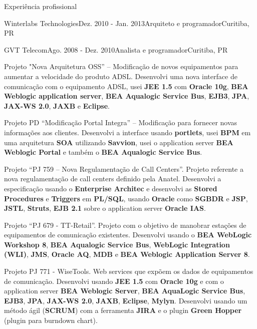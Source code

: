\documentclass{resume}
\begin{document}
\begin{rSection}{Experiência profissional}
\begin{rSubsection}{Winterlabs Technologies}{Dez. 2010 - Jan. 2013}{Arquiteto e programador}{Curitiba, PR}
    \end{rSubsection}
    \begin{rSubsection}{GVT Telecom}{Ago. 2008 - Dez. 2010}{Analista e programador}{Curitiba, PR}
    \item Projeto "Nova Arquitetura OSS” – Modificação de novos equipamentos para aumentar a velocidade do produto ADSL. Desenvolvi uma nova interface de comunicação com o equipamento ADSL, usei \textbf{JEE 1.5} com \textbf{Oracle 10g}, \textbf{BEA Weblogic application server}, \textbf{BEA Aqualogic Service Bus}, \textbf{EJB3}, \textbf{JPA}, \textbf{JAX-WS 2.0}, \textbf{JAXB} e \textbf{Eclipse}.\\
    \item Projeto PD “Modificação Portal Integra” – Modificação para fornecer novas informações aos clientes. Desenvolvi a interface usando \textbf{portlets}, usei \textbf{BPM} em uma arquitetura \textbf{SOA} utilizando \textbf{Savvion}, usei o application server \textbf{BEA Weblogic Portal} e também o \textbf{BEA Aqualogic Service Bus}.\\
    \item Projeto “PJ 759 – Nova Regulamentação de Call Centers”. Projeto referente a nova regulamentação de call centers definido pela Anatel. Desenvolvi a especificação usando o \textbf{Enterprise Architec} e desenvolvi as \textbf{Stored Procedures} e \textbf{Triggers} em \textbf{PL/SQL}, usando \textbf{Oracle} como \textbf{SGBDR} e \textbf{JSP}, \textbf{JSTL}, \textbf{Struts}, \textbf{EJB 2.1} sobre o application server \textbf{Oracle IAS}.\\
    \item Projeto “PJ 679 - TT-Retail”. Projeto com o objetivo de manobrar estações de equipamentos de comunicação existentes. Desenvolvi usando o \textbf{BEA WebLogic Workshop 8}, \textbf{BEA Aqualogic Service Bus}, \textbf{WebLogic Integration (WLI)}, \textbf{JMS}, \textbf{Oracle AQ}, \textbf{MDB} e \textbf{BEA Weblogic Application Server 8}.\\
    \item Projeto PJ 771 - WiseTools. Web services que expõem os dados de equipamentos de comunicação. Desenvolvi usando \textbf{JEE 1.5} com \textbf{Oracle 10g} e com o application server \textbf{BEA Weblogic Server}, \textbf{BEA AquaLogic Service Bus}, \textbf{EJB3}, \textbf{JPA}, \textbf{JAX-WS 2.0}, \textbf{JAXB}, \textbf{Eclipse}, \textbf{Mylyn}. Desenvolvi usando um método ágil (\textbf{SCRUM}) com a ferramenta \textbf{JIRA} e o plugin \textbf{Green Hopper} (plugin para burndown chart).\\

\end{rSubsection}
\end{rSection}
\end{document}

